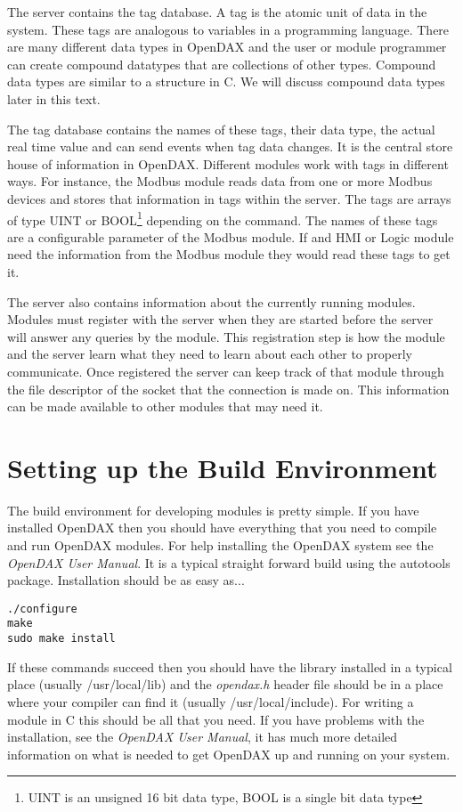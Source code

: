 \documentclass[10pt,letterpaper]{report}
\begin{document}
The server contains the tag database.  A tag is the atomic unit of data in the system.  These tags are analogous to variables in a programming language.  There are many different data types in OpenDAX and the user or module programmer can create compound datatypes that are collections of other types.  Compound data types are similar to a structure in C.  We will discuss compound data types later in this text.

The tag database contains the names of these tags, their data type, the actual real time value and can send events when tag data changes.  It is the central store house of information in OpenDAX.  Different modules work with tags in different ways.  For instance, the Modbus module reads data from one or more Modbus devices and stores that information in tags within the server.  The tags are arrays of type UINT or BOOL\footnote{UINT is an unsigned 16 bit data type, BOOL is a single bit data type} depending on the command.  The names of these tags are a configurable parameter of the Modbus module.  If and HMI or Logic module need the information from the Modbus module they would read these tags to get it.

The server also contains information about the currently running modules.  Modules must register with the server when they are started before the server will answer any queries by the module.  This registration step is how the module and the server learn what they need to learn about each other to properly communicate.  Once registered the server can keep track of that module through the file descriptor of the socket that the connection is made on.  This information can be made available to other modules that may need it.

\section{Setting up the Build Environment}
The build environment for developing modules is pretty simple.  If you have installed OpenDAX then you should have everything that you need to compile and run OpenDAX modules.  For help installing the OpenDAX system see the \textit{OpenDAX User Manual}. It is a typical straight forward build using the autotools package.  Installation should be as easy as...

\begin{verbatim}
./configure
make
sudo make install
\end{verbatim}

If these commands succeed then you should have the library installed in a typical place (usually /usr/local/lib) and the \textit{opendax.h} header file should be in a place where your compiler can find it (usually /usr/local/include).  For writing a module in C this should be all that you need.  If you have problems with the installation, see the \textit{OpenDAX User Manual}, it has much more detailed information on what is needed to get OpenDAX up and running on your system.
\end{document}
